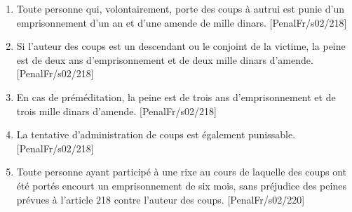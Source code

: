 \begin{enumerate}\small
\item Toute personne qui, volontairement, porte des coups à autrui est punie d'un emprisonnement d'un an et d'une amende de mille dinars. \hfill{\footnotesize[PenalFr/s02/218]}
\item Si l'auteur des coups est un descendant ou le conjoint de la victime, la peine est de deux ans d'emprisonnement et de deux mille dinars d'amende. \hfill{\footnotesize[PenalFr/s02/218]}
\item En cas de préméditation, la peine est de trois ans d'emprisonnement et de trois mille dinars d'amende. \hfill{\footnotesize[PenalFr/s02/218]}
\item La tentative d'administration de coups est également punissable. \hfill{\footnotesize[PenalFr/s02/218]}
\item Toute personne ayant participé à une rixe au cours de laquelle des coups ont été portés encourt un emprisonnement de six mois, sans préjudice des peines prévues à l'article 218 contre l'auteur des coups. \hfill{\footnotesize[PenalFr/s02/220]}
\end{enumerate}
